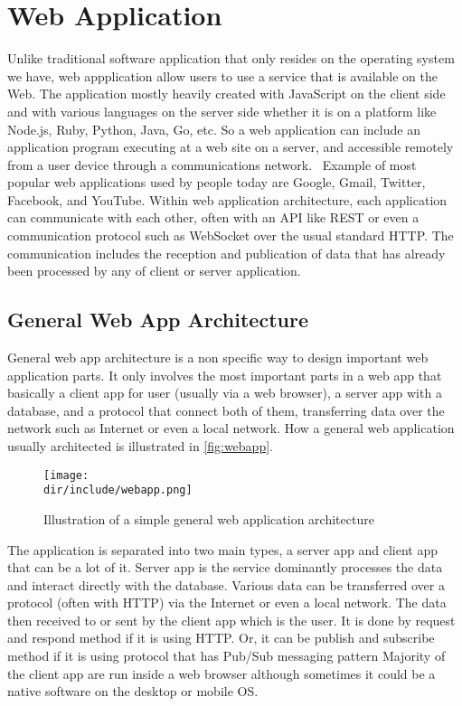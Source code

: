 \section{Web Application}
\label{sec:webapp}

Unlike traditional software application that only resides on the operating system we have, web appplication allow users to use a service that is available on the Web.
The application mostly heavily created with JavaScript on the client side and with various languages on the server side whether it is on a platform like Node.js, Ruby, Python, Java, Go, etc.
So a web application can include an application program executing at a web site on a server, and accessible remotely from a user device through a communications network.~\autocite{Addala:2013:InteractiveWebAppFramework}
Example of most popular web applications used by people today are Google, Gmail, Twitter, Facebook, and YouTube.
Within web application architecture, each application can communicate with each other, often with an \ac{API} like \ac{REST} or even a communication protocol such as WebSocket over the usual standard \ac{HTTP}.
The communication includes the reception and publication of data that has already been processed by any of client or server application.

\subsection{General Web App Architecture}
\label{ssec:general-webapp-arch}

General web app architecture is a non specific way to design important web application parts.
It only involves the most important parts in a web app that basically a client app for user (usually via a web browser), a server app with a database, and a protocol that connect both of them, transferring data over the network such as Internet or even a local network.
How a general web application usually architected is illustrated in \autoref{fig:webapp}.

\begin{figure}[htbp]
    \centering
    \texttt{[image: \\dir/include/webapp.png]}
    \caption[General Web Application Architecture]{Illustration of a simple general web application architecture}
    \label{fig:webapp}
\end{figure}

The application is separated into two main types, a server app and client app that can be a lot of it.
Server app is the service dominantly processes the data and interact directly with the database.
Various data can be transferred over a protocol (often with \ac{HTTP}) via the Internet or even a local network.
The data then received to or sent by the client app which is the user.
It is done by request and respond method if it is using \ac{HTTP}.
Or, it can be publish and subscribe method if it is using protocol that has \ac{Pub/Sub} messaging pattern
Majority of the client app are run inside a web browser although sometimes it could be a native software on the desktop or mobile \ac{OS}.
